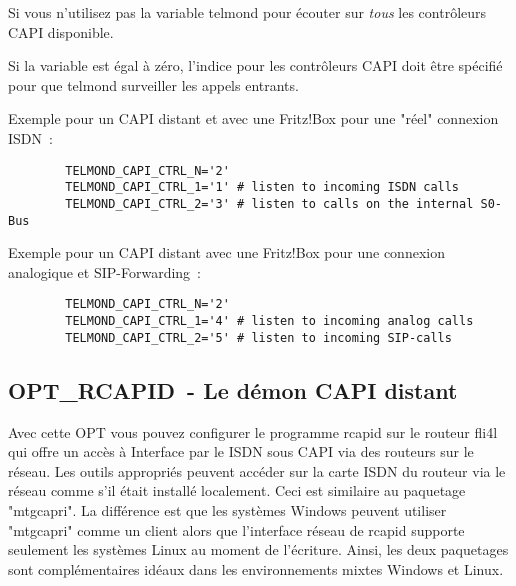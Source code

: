 \begin{description}
  Si vous n'utilisez pas la variable telmond pour écouter sur \emph{tous} les
  contrôleurs CAPI disponible.


  Si la variable  est égal à zéro, l'indice pour
  les contrôleurs CAPI doit être spécifié pour que telmond surveiller les
  appels entrants.

   Exemple pour un CAPI distant et avec une Fritz!Box pour une "réel" connexion ISDN~:

\begin{example}
\begin{verbatim}
        TELMOND_CAPI_CTRL_N='2'
        TELMOND_CAPI_CTRL_1='1' # listen to incoming ISDN calls
        TELMOND_CAPI_CTRL_2='3' # listen to calls on the internal S0-Bus
\end{verbatim}
\end{example}

  Exemple pour un CAPI distant avec une Fritz!Box pour une connexion analogique
  et SIP-Forwarding~:

\begin{example}
\begin{verbatim}
        TELMOND_CAPI_CTRL_N='2'
        TELMOND_CAPI_CTRL_1='4' # listen to incoming analog calls
        TELMOND_CAPI_CTRL_2='5' # listen to incoming SIP-calls
\end{verbatim}
\end{example}
\end{description}

\subsection{OPT\_RCAPID~- Le démon CAPI distant}

  Avec cette OPT vous pouvez configurer le programme rcapid sur le routeur fli4l
  qui offre un accès à Interface par le ISDN sous CAPI via des routeurs sur
  le réseau. Les outils appropriés peuvent accéder sur la carte ISDN du routeur
  via le réseau comme s'il était installé localement. Ceci est similaire au
  paquetage "mtgcapri". La différence est que les systèmes Windows peuvent
  utiliser "mtgcapri" comme un client alors que l'interface réseau de rcapid
  supporte seulement les systèmes Linux au moment de l'écriture. Ainsi, les
  deux paquetages sont complémentaires idéaux dans les environnements mixtes
  Windows et Linux.

